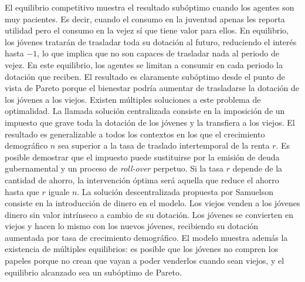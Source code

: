 \documentclass{nuevotema}
\begin{document}
El equilibrio competitivo muestra el resultado subóptimo cuando los agentes son muy pacientes. Es decir, cuando el consumo en la juventud apenas les reporta utilidad pero el consumo en la vejez sí que tiene valor para ellos. En equilibrio, los jóvenes tratarán de trasladar toda su dotación al futuro, reduciendo el interés hasta $-1$, lo que implica que no son capaces de trasladar nada al periodo de vejez. En este equilibrio, los agentes se limitan a consumir en cada periodo la dotación que reciben. El resultado es claramente subóptimo desde el punto de vista de Pareto porque el bienestar podría aumentar de trasladarse la dotación de los jóvenes a los viejos. Existen múltiples soluciones a este problema de optimalidad. La llamada solución centralizada consiste en la imposición de un impuesto que grave toda la dotación de los jóvenes y la transfiera a los viejos. El resultado es generalizable a todos los contextos en los que el crecimiento demográfico $n$ sea superior a la tasa de traslado intertemporal de la renta $r$. Es posible demostrar que el impuesto puede sustituirse por la emisión de deuda gubernamental y un proceso de \textit{roll-over} perpetuo. Si la tasa $r$ depende de la cantidad de ahorro, la intervención óptima será aquella que reduce el ahorro hasta que $r$ iguale $n$. La solución descentralizada propuesta por Samuelson consiste en la introducción de dinero en el modelo. Los viejos venden a los jóvenes dinero sin valor intrínseco a cambio de su dotación. Los jóvenes se convierten en viejos y hacen lo mismo con los nuevos jóvenes, recibiendo su dotación aumentada por tasa de crecimiento demográfico. El modelo muestra además la existencia de múltiples equilibrios: es posible que los jóvenes no compren los papeles porque no crean que vayan a poder venderlos cuando sean viejos, y el equilibrio alcanzado sea un subóptimo de Pareto. 
\end{document}
